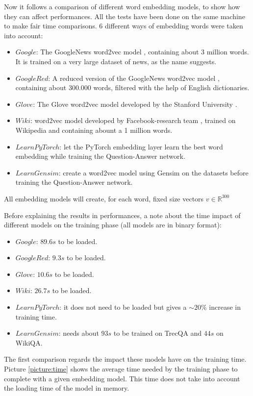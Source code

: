 \documentclass[11pt,a4paper]{article}
\begin{document}
Now it follows a comparison of different word embedding models, to show how they can affect performances. All the tests have been done on the same machine to make fair time comparisons. 6 different ways of embedding words were taken into account:
\begin{itemize}
    \item $Google$: The GoogleNews word2vec model \cite{w2v}, containing about 3 million words. It is trained on a very large dataset of news, as the name suggests.
    \item{$GoogleRed$: A reduced version of the GoogleNews word2vec model \cite{git}, containing about $300.000$ words, filtered with the help of English dictionaries. }
    \item{$Glove$: The Glove word2vec model developed by the Stanford University \cite{glove}.}
    \item{$Wiki$: word2vec model developed by Facebook-research team \cite{wiki}, trained on Wikipedia and containing abount a 1 million words.}
    \item{$LearnPyTorch$: let the PyTorch embedding layer \cite{embedding} learn the best word embedding while training the Question-Answer network.}
    \item{$LearnGensim$: create a word2vec model using Gensim \cite{gensim} on the datasets before training the Question-Answer network.}
\end{itemize}
All embedding models will create, for each word, fixed size vectors $v \in \mathbb{R}^{300}$

Before explaining the results in performances, a note about the time impact of different models on the training phase (all models are in binary format):
\begin{itemize}
    \item $Google$: $89.6s$ to be loaded.
    \item $GoogleRed$: $9.3s$ to be loaded.
    \item $Glove$: $10.6s$ to be loaded.
    \item $Wiki$: $26.7s$ to be loaded.
    \item $LearnPyTorch$: it does not need to be loaded but gives a $\sim20\%$ increase in training time. \item $LearnGensim$: needs about $93s$ to be trained on TrecQA and $44s$ on WikiQA.
\end{itemize}

The first comparison regards the impact these models have on the training time. Picture \ref{picture:time} shows the average time needed by the training phase to complete with a given embedding model. This time does not take into account the loading time of the model in memory.
\end{document}
